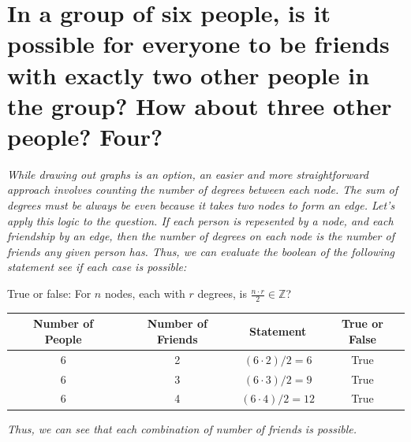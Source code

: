 \documentclass{article}
\begin{document}
\section{In a group of six people, is it possible for everyone
    to be friends with exactly two other people in the group?
    How about three other people? Four?}
\hspace{1cm}\textit{While drawing out graphs is an option, an
    easier and more straightforward approach involves counting
    the number of degrees between each node. The sum of degrees
    must be always be even because it takes two nodes to form
    an edge. Let's apply this logic to the question. If each person
    is repesented by a node, and each friendship by an edge, then the
    number of degrees on each node is the number of friends any given
    person has. Thus, we can evaluate the boolean of the following
    statement see if each case is possible:}
\begin{center}
    \large{True or false: For $n$ nodes, each with $r$ degrees, is 
    $\frac{n\cdot r}{2} \in \mathbb{Z}$?} \\
    \vspace{0.25cm}
    \normalsize{}
    \begin{tabular}{|c|c|c|c|}
        \hline
        Number of People & Number of Friends & Statement & True or False \\
        \hline
        6 & 2 & $(6\cdot 2)/2 = 6$ & True \\
        6 & 3 & $(6\cdot 3)/2 = 9$ & True \\
        6 & 4 & $(6\cdot 4)/2 = 12$ & True \\
        \hline
    \end{tabular}
\end{center}
\hspace{1cm}\textit{Thus, we can see that each combination of number
    of friends is possible.}
\clearpage

\end{document}
